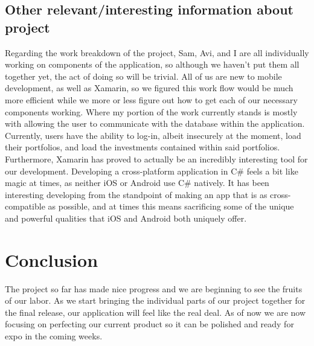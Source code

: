 \documentclass[letterpaper,10pt,titlepage,journal,compsoc,draftclsnofoot,onecolumn]{IEEEtran}
\begin{document}
\subsection{Other relevant/interesting information about project}
Regarding the work breakdown of the project, Sam, Avi, and I are all individually working on components of the application, so although we haven't put them all together yet, the act of doing so will be trivial. All of us are new to mobile development, as well as Xamarin, so we figured this work flow would be much more efficient while we more or less figure out how to get each of our necessary components working. Where my portion of the work currently stands is mostly with allowing the user to communicate with the database within the application. Currently, users have the ability to log-in, albeit insecurely at the moment, load their portfolios, and load the investments contained within said portfolios. Furthermore, Xamarin has proved to actually be an incredibly interesting tool for our development. Developing a cross-platform application in C\# feels a bit like magic at times, as neither iOS or Android use C\# natively. It has been interesting developing from the standpoint of making an app that is as cross-compatible as possible, and at times this means sacrificing some of the unique and powerful qualities that iOS and Android both uniquely offer. 


\section{Conclusion}
The project so far has made nice progress and we are beginning to see the fruits of our labor. As we start bringing the individual parts of our project together for the final release, our application will feel like the real deal. As of now we are now focusing on perfecting our current product so it can be polished and ready for expo in the coming weeks. 
\end{document}
